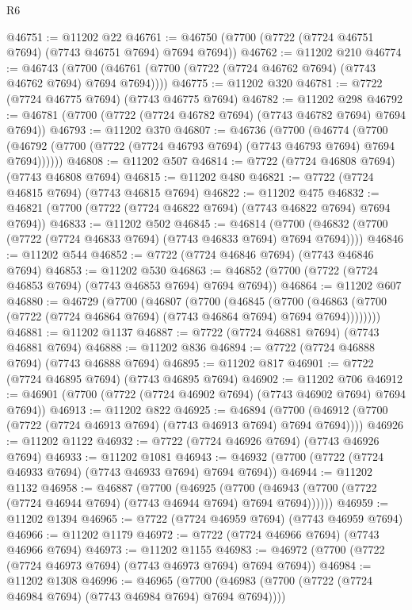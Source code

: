 \begin{lexlean}{R6}
\begin{coremodule}
@46751 := @11202 @22
@46761 := @46750 (@7700 (@7722 (@7724 @46751 @7694) (@7743 @46751 @7694) @7694 @7694))
@46762 := @11202 @210
@46774 := @46743
    (@7700 (@46761 (@7700 (@7722 (@7724 @46762 @7694) (@7743 @46762 @7694) @7694 @7694))))
@46775 := @11202 @320
@46781 := @7722 (@7724 @46775 @7694) (@7743 @46775 @7694)
@46782 := @11202 @298
@46792 := @46781 (@7700 (@7722 (@7724 @46782 @7694) (@7743 @46782 @7694) @7694 @7694))
@46793 := @11202 @370
@46807 := @46736
    (@7700
      (@46774
        (@7700 (@46792 (@7700 (@7722 (@7724 @46793 @7694) (@7743 @46793 @7694) @7694 @7694))))))
@46808 := @11202 @507
@46814 := @7722 (@7724 @46808 @7694) (@7743 @46808 @7694)
@46815 := @11202 @480
@46821 := @7722 (@7724 @46815 @7694) (@7743 @46815 @7694)
@46822 := @11202 @475
@46832 := @46821 (@7700 (@7722 (@7724 @46822 @7694) (@7743 @46822 @7694) @7694 @7694))
@46833 := @11202 @502
@46845 := @46814
    (@7700 (@46832 (@7700 (@7722 (@7724 @46833 @7694) (@7743 @46833 @7694) @7694 @7694))))
@46846 := @11202 @544
@46852 := @7722 (@7724 @46846 @7694) (@7743 @46846 @7694)
@46853 := @11202 @530
@46863 := @46852 (@7700 (@7722 (@7724 @46853 @7694) (@7743 @46853 @7694) @7694 @7694))
@46864 := @11202 @607
@46880 := @46729
    (@7700
      (@46807
        (@7700
          (@46845
            (@7700
              (@46863 (@7700 (@7722 (@7724 @46864 @7694) (@7743 @46864 @7694) @7694 @7694))))))))
@46881 := @11202 @1137
@46887 := @7722 (@7724 @46881 @7694) (@7743 @46881 @7694)
@46888 := @11202 @836
@46894 := @7722 (@7724 @46888 @7694) (@7743 @46888 @7694)
@46895 := @11202 @817
@46901 := @7722 (@7724 @46895 @7694) (@7743 @46895 @7694)
@46902 := @11202 @706
@46912 := @46901 (@7700 (@7722 (@7724 @46902 @7694) (@7743 @46902 @7694) @7694 @7694))
@46913 := @11202 @822
@46925 := @46894
    (@7700 (@46912 (@7700 (@7722 (@7724 @46913 @7694) (@7743 @46913 @7694) @7694 @7694))))
@46926 := @11202 @1122
@46932 := @7722 (@7724 @46926 @7694) (@7743 @46926 @7694)
@46933 := @11202 @1081
@46943 := @46932 (@7700 (@7722 (@7724 @46933 @7694) (@7743 @46933 @7694) @7694 @7694))
@46944 := @11202 @1132
@46958 := @46887
    (@7700
      (@46925
        (@7700 (@46943 (@7700 (@7722 (@7724 @46944 @7694) (@7743 @46944 @7694) @7694 @7694))))))
@46959 := @11202 @1394
@46965 := @7722 (@7724 @46959 @7694) (@7743 @46959 @7694)
@46966 := @11202 @1179
@46972 := @7722 (@7724 @46966 @7694) (@7743 @46966 @7694)
@46973 := @11202 @1155
@46983 := @46972 (@7700 (@7722 (@7724 @46973 @7694) (@7743 @46973 @7694) @7694 @7694))
@46984 := @11202 @1308
@46996 := @46965
    (@7700 (@46983 (@7700 (@7722 (@7724 @46984 @7694) (@7743 @46984 @7694) @7694 @7694))))

\end{coremodule}
\end{lexlean}
